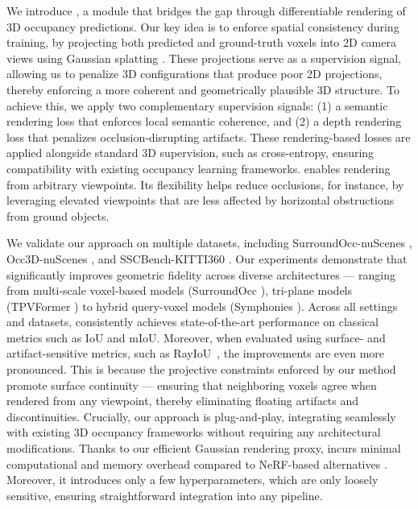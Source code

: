 We {introduce} \method{}, a {module} that bridges the gap through differentiable rendering of 3D occupancy predictions.
Our key idea is to enforce spatial consistency {during training,} by projecting both predicted and ground-truth voxels into 2D camera views using Gaussian splatting \cite{kerbl3Dgaussians}.
{These projections serve as a supervision signal, allowing us to penalize 3D configurations that produce poor 2D projections, thereby enforcing a more coherent and geometrically plausible 3D structure.}
{To achieve this, we apply two complementary supervision signals:}
{(1) a semantic rendering loss that enforces local semantic coherence, }
and (2) a depth rendering loss that penalizes occlusion-disrupting artifacts.
These rendering-based losses are applied alongside standard 3D supervision, such as cross-entropy, ensuring compatibility with existing occupancy learning frameworks.
{\method{} enables rendering from arbitrary viewpoints.}
Its flexibility helps reduce occlusions, 
for instance, by leveraging elevated viewpoints 
that are {less affected by horizontal obstructions from 
ground objects.}

We validate our approach on multiple datasets, including SurroundOcc-nuScenes \cite{wei2023surroundocc}, Occ3D-nuScenes \cite{tian2023occ3d}, and SSCBench-KITTI360 \cite{li2024sscbench}. Our experiments demonstrate that \method{} significantly improves geometric fidelity across diverse architectures --- ranging from multi-scale voxel-based models (SurroundOcc \cite{wei2023surroundocc}), tri-plane models (TPVFormer \cite{huang2023tpv}) to hybrid query-voxel models (Symphonies \cite{jiang2024symphonies}).
Across all settings and datasets, \method{} consistently achieves state-of-the-art performance on classical metrics such as IoU and mIoU. Moreover, when evaluated using surface- and artifact-sensitive metrics, {such as RayIoU~\cite{liu2024sparseocc}},
the improvements are even more pronounced. This is because the projective constraints enforced by our method promote surface continuity --- ensuring that neighboring voxels agree when rendered from any viewpoint, thereby eliminating floating artifacts and discontinuities.
Crucially, our approach is plug-and-play, integrating seamlessly with existing 3D occupancy frameworks without requiring any architectural modifications. Thanks to our efficient Gaussian rendering proxy, \method{} incurs minimal computational and memory overhead compared to NeRF-based alternatives \cite{huang2024selfocc, pan2024renderocc}.
Moreover, it introduces only a few hyperparameters, which are only loosely sensitive, ensuring straightforward integration into any pipeline.


